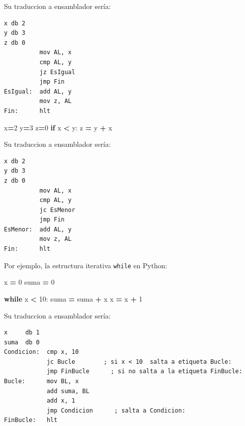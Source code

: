 \documentclass[12pt,oneside]{templates/unerthesis}
\newenvironment{Shaded}{\begin{snugshade}}{\end{snugshade}}
\newcommand{\ControlFlowTok}[1]{\textcolor[rgb]{0.13,0.29,0.53}{\textbf{#1}}}
\newcommand{\DecValTok}[1]{\textcolor[rgb]{0.00,0.00,0.81}{#1}}
\newcommand{\NormalTok}[1]{#1}
\newcommand{\OperatorTok}[1]{\textcolor[rgb]{0.81,0.36,0.00}{\textbf{#1}}}
\begin{document}
Su traduccion a ensamblador sería:

\begin{lstlisting}
x db 2 
y db 3
z db 0
          mov AL, x
          cmp AL, y
          jz EsIgual
          jmp Fin
EsIgual:  add AL, y
          mov z, AL 
Fin:      hlt\end{lstlisting}

\begin{Shaded}
\begin{Highlighting}[]
\NormalTok{x}\OperatorTok{=}\DecValTok{2}
\NormalTok{y}\OperatorTok{=}\DecValTok{3}
\NormalTok{z}\OperatorTok{=}\DecValTok{0}
\ControlFlowTok{if}\NormalTok{ x }\OperatorTok{\textless{}}\NormalTok{ y:}
\NormalTok{  z }\OperatorTok{=}\NormalTok{ y  }\OperatorTok{+}\NormalTok{ x}
\end{Highlighting}
\end{Shaded}

Su traduccion a ensamblador sería:

\begin{lstlisting}
x db 2 
y db 3
z db 0
          mov AL, x
          cmp AL, y
          jc EsMenor
          jmp Fin
EsMenor:  add AL, y
          mov z, AL 
Fin:      hlt\end{lstlisting}

Por ejemplo, la estructura iterativa \texttt{while} en Python:

\begin{Shaded}
\begin{Highlighting}[]
\NormalTok{x }\OperatorTok{=} \DecValTok{0}
\NormalTok{suma }\OperatorTok{=} \DecValTok{0}

\ControlFlowTok{while}\NormalTok{ x }\OperatorTok{\textless{}} \DecValTok{10}\NormalTok{:}
\NormalTok{    suma }\OperatorTok{=}\NormalTok{ suma }\OperatorTok{+}\NormalTok{ x}
\NormalTok{    x }\OperatorTok{=}\NormalTok{ x }\OperatorTok{+} \DecValTok{1}
\end{Highlighting}
\end{Shaded}

Su traduccion a ensamblador sería:

\begin{lstlisting}
x     db 1   
suma  db 0   
Condicion:  cmp x, 10 
            jc Bucle        ; si x < 10  salta a etiqueta Bucle:
            jmp FinBucle      ; si no salta a la etiqueta FinBucle:
Bucle:      mov BL, x
            add suma, BL
            add x, 1
            jmp Condicion      ; salta a Condicion:
FinBucle:   hlt
\end{lstlisting}
\end{document}
